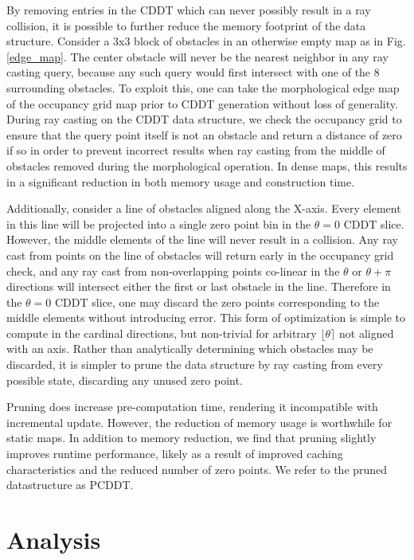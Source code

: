 \documentclass[letterpaper, 10 pt, conference]{ieeeconf}  %
\begin{document}
By removing entries in the CDDT which can never possibly result in a ray collision, it is possible to further reduce the memory footprint of the data structure. Consider a 3x3 block of obstacles in an otherwise empty map as in Fig. \ref{edge_map}. The center obstacle will never be the nearest neighbor in any ray casting query, because any such query would first intersect with one of the 8 surrounding obstacles. To exploit this, one can take the morphological edge map of the occupancy grid map prior to CDDT generation without loss of generality. During ray casting on the CDDT data structure, we check the occupancy grid to ensure that the query point itself is not an obstacle and return a distance of zero if so in order to prevent incorrect results when ray casting from the middle of obstacles removed during the morphological operation. In dense maps, this results in a significant reduction in both memory usage and construction time.

Additionally, consider a line of obstacles aligned along the X-axis. Every element in this line will be projected into a single zero point bin in the $\theta=0$ CDDT slice. However, the middle elements of the line will never result in a collision. Any ray cast from points on the line of obstacles will return early in the occupancy grid check, and any ray cast from non-overlapping points co-linear in the $\theta$ or $\theta+\pi$ directions will intersect either the first or last obstacle in the line. Therefore in the $\theta=0$ CDDT slice, one may discard the zero points corresponding to the middle elements without introducing error. This form of optimization is simple to compute in the cardinal directions, but non-trivial for arbitrary $\lfloor\theta\rceil$ not aligned with an axis. Rather than analytically determining which obstacles may be discarded, it is simpler to prune the data structure by ray casting from every possible state, discarding any unused zero point. 

Pruning does increase pre-computation time, rendering it incompatible with incremental update. However, the reduction of memory usage is worthwhile for static maps. In addition to memory reduction, we find that pruning slightly improves runtime performance, likely as a result of improved caching characteristics and the reduced number of zero points. We refer to the pruned datastructure as PCDDT.

\section{Analysis}
\end{document}
